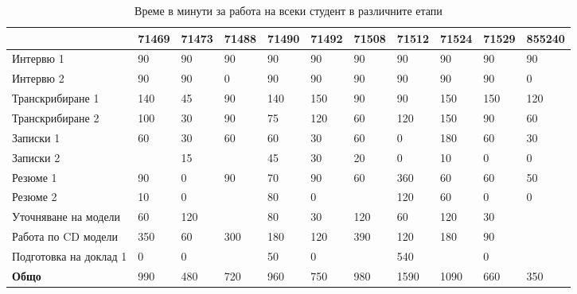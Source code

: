\documentclass[a4paper]{article}
\begin{document}
\begin{table}[h]
\centering
\caption{Време в минути за работа на всеки студент в различните етапи}
\label{my-label}
\begin{tabular}{|l|l|l|l|l|l|l|l|l|l|l|}
\hline
                        & 71469 & 71473 & 71488 & 71490 & 71492 & 71508 & 71512 & 71524 & 71529 & 855240 \\ \hline
Интервю 1               & 90    & 90    & 90    & 90    & 90    & 90    & 90    & 90    & 90    & 90     \\ \hline
Интервю 2               & 90    & 90    & 0     & 90    & 90    & 90    & 90    & 90    & 90    & 0      \\ \hline
Транскрибиране 1        & 140   & 45    & 90    & 140   & 150   & 90    & 90    & 150   & 150   & 120    \\ \hline
Транскрибиране 2        & 100   & 30    & 90    & 75    & 120   & 60    & 120   & 150   & 90    & 60     \\ \hline
Записки 1               & 60    & 30    & 60    & 60    & 30    & 60    & 0     & 180   & 60    & 30     \\ \hline
Записки 2               &       & 15    &       & 45    & 30    & 20    & 0     & 10    & 0     & 0      \\ \hline
Резюме 1                & 90    & 0     & 90    & 70    & 90    & 60    & 360   & 60    & 60    & 50     \\ \hline
Резюме 2                & 10    & 0     &       & 80    & 0     &       & 120   & 60    & 0     & 0      \\ \hline
Уточняване на модели    & 60    & 120   &       & 80    & 30    & 120   & 60    & 120   & 30    &        \\ \hline
Работа по CD модели     & 350   & 60    & 300   & 180   & 120   & 390   & 120   & 180   & 90    &        \\ \hline
Подготовка на доклад 1  & 0     & 0     &       & 50    & 0     &       & 540   &       & 0     &        \\ \hline
\textbf{Общо}           & 990   & 480   & 720   & 960   & 750   & 980   & 1590  & 1090  & 660   & 350    \\ \hline
\end{tabular}
\end{table}
\end{document}
